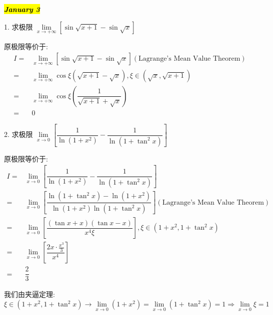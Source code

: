 \hl{\textbf{\textit{January 3}}}

1. 求极限 $\lim\limits_{x\to +\infty}[\sin\sqrt{x+1}-\sin\sqrt{x}]$
\begin{solution}
	
	原极限等价于:
	\begin{align*}
		I = & \lim\limits_{x\to +\infty}[\sin\sqrt{x+1}-\sin\sqrt{x}](\text{Lagrange's Mean Value Theorem})\\
		  = & \lim\limits_{x\to +\infty}\cos \xi(\sqrt{x+1}-\sqrt{x}),\xi\in(\sqrt{x},\sqrt{x+1})\\
		  = & \lim\limits_{x\to +\infty}\cos \xi(\dfrac{1}{\sqrt{x+1}+\sqrt{x}})\\
		  = & 0
	\end{align*}
\end{solution}

2. 求极限 $\lim\limits_{x\to 0}[\dfrac{1}{\ln(1+x^{2})}-\dfrac{1}{\ln(1+\tan^{2}x)}]$
\begin{solution}
	
	原极限等价于:
	\begin{align*}
		I = & \lim\limits_{x\to 0}[\dfrac{1}{\ln(1+x^{2})}-\dfrac{1}{\ln(1+\tan^{2}x)}]\\
		  = & \lim\limits_{x\to 0}[\dfrac{\ln(1+\tan^{2}x)-\ln(1+x^{2})}{\ln(1+x^{2})\ln(1+\tan^{2}x)}] (\text{Lagrange's Mean Value Theorem})\\
		  = & \lim\limits_{x\to 0}[\dfrac{(\tan x+x)(\tan x-x)}{x^{4}\xi}], \xi\in(1+x^{2},1+\tan^{2}x)\\
		  = & \lim\limits_{x\to 0}[\dfrac{2x\cdot \frac{x^{3}}{3}}{x^{4}}]\\
		  = & \dfrac{2}{3}
	\end{align*}

	我们由夹逼定理: $\xi\in(1+x^{2},1+\tan^{2}x)\to \lim\limits_{x\to 0}(1+x^{2}) = \lim\limits_{x\to 0} (1+\tan^{2}x) = 1\Rightarrow \lim\limits_{x\to 0}\xi = 1$
\end{solution}

